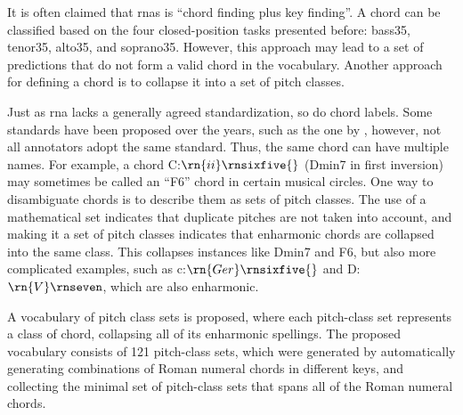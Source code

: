 
It is often claimed that \glspl{rna} is ``chord finding plus
key finding''. A chord can be classified based on the four
\gls{closed-position} tasks presented before: \gls{bass35},
\gls{tenor35}, \gls{alto35}, and \gls{soprano35}. However,
this approach may lead to a set of predictions that do not
form a valid chord in the vocabulary. Another approach for
defining a chord is to collapse it into a set of pitch
classes.

Just as \gls{rna} lacks a generally agreed standardization,
so do chord labels. Some standards have been proposed over
the years, such as the one by \textcite{harte2005automatic},
however, not all annotators adopt the same standard. Thus,
the same chord can have multiple names. For example, a chord
C:$\rn{ii}\rnsixfive{}$ (Dmin7 in first inversion) may
sometimes be called an ``F6'' chord in certain musical
circles. One way to disambiguate chords is to describe them
as sets of pitch classes. The use of a mathematical set
indicates that duplicate pitches are not taken into account,
and making it a set of pitch classes indicates that
enharmonic chords are collapsed into the same class. This
collapses instances like Dmin7 and F6, but also more
complicated examples, such as c:$\rn{Ger}\rnsixfive{}$ and
D\musFlat{}:$\rn{V}\rnseven$, which are also enharmonic.

A vocabulary of pitch class sets is proposed, where each
pitch-class set represents a class of chord, collapsing all
of its enharmonic spellings. The proposed vocabulary
consists of 121 pitch-class sets, which were generated by
automatically generating combinations of Roman numeral
chords in different keys, and collecting the minimal set of
pitch-class sets that spans all of the Roman numeral chords.


